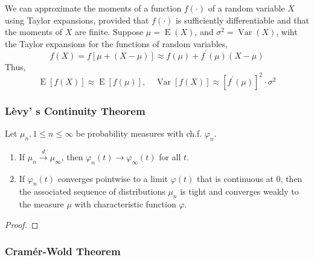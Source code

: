 \begin{remark}
    We can approximate the moments of a function $f(\cdot)$ of a random variable $X$ using Taylor expansions, provided that $f(\cdot)$ is sufficiently differentiable and that the moments of $X$ are finite. Suppose $\mu=\operatorname{E}\left(X\right)$, and $\sigma^{2}=\operatorname{Var}\left(X\right)$, wiht the Taylor expansions for the functions of random variables,
    \begin{equation}
        f\left(X\right)=f\left[\mu+\left(X-\mu\right)\right]\approx f\left(\mu\right)+f^{\prime}\left(\mu\right)\left(X-\mu\right)
    \end{equation}
    Thus,
    \begin{equation}
        \operatorname{E}\left[f\left(X\right)\right]\approx\operatorname{E}\left[f\left(\mu\right)\right],\quad\operatorname{Var}\left[f(X)\right]\approx\left[f^{\prime}\left(\mu\right)\right]^{2}\cdot\sigma^{2}
    \end{equation}
\end{remark}

\subsubsection{L\`evy' s Continuity Theorem}

\begin{theorem}
    Let $\mu_{n},1\leq n\leq\infty$ be probability measures with ch.f. $\varphi_{n}$.
    \begin{enumerate}
        \item If $\mu_{n}\stackrel{d}{\rightarrow}\mu_{\infty}$, then $\varphi_{n}(t)\rightarrow\varphi_{\infty}(t)$ for all $t$.
        \item If $\varphi_{n}(t)$ converges pointwise to a limit $\varphi(t)$ that is continuous at $0$, then the associated sequence of distributions $\mu_{n}$ is tight and converges weakly to the measure $\mu$ with characteristic function $\varphi$.
    \end{enumerate}
\end{theorem}

\begin{proof}

\end{proof}

\subsubsection{Cram\'er-Wold Theorem}

